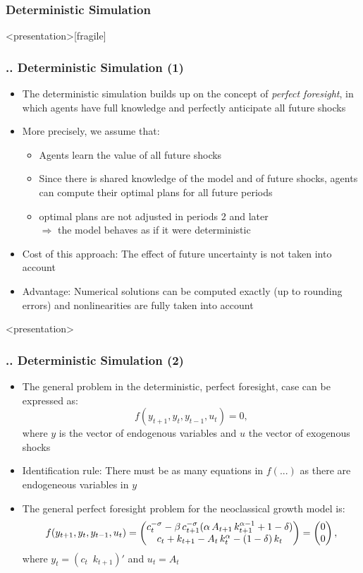 \documentclass[11pt,aspectratio=169]{beamer}
\begin{document}
\subsubsection{Deterministic Simulation}
\begin{frame}<presentation>[fragile]
	\frametitle{{\thesection.\thesubsection.\thesubsubsection} Deterministic Simulation (1)}
	\begin{itemize}
		\item The deterministic simulation builds up on the concept of \textit{perfect foresight}, in which agents have full knowledge and perfectly anticipate all future shocks
		\item More precisely, we assume that:
		\begin{itemize}
			\item Agents learn the value of all future shocks
			\item Since there is shared knowledge of the model and of future shocks, agents can compute their optimal plans for all future periods
			\item optimal plans are not adjusted in periods 2 and later\\ $\Rightarrow$ the model behaves as if it were deterministic
		\end{itemize}
		\item Cost of this approach: The effect of future uncertainty is not taken into account
		\item Advantage: Numerical solutions can be computed exactly (up to rounding errors) and nonlinearities are fully taken into account
	\end{itemize}
\end{frame}
\begin{frame}<presentation>
	\frametitle{{\thesection.\thesubsection.\thesubsubsection} Deterministic Simulation (2)}
	\begin{itemize}
		\item The general problem in the deterministic, perfect foresight, case can be expressed as: $$f(y_{t+1},y_t,y_{t-1},u_t)=0,$$ where $y$ is the vector of endogenous variables and $u$ the vector of exogenous shocks
		\item Identification rule: There must be as many equations in $f(...)$ as there are endogeneous variables in $y$
		\item The general perfect foresight problem for the neoclassical growth model is:
		\begin{gather*}
		f(y_{t+1},y_t,y_{t-1},u_t) = \begin{pmatrix} 	c_t^{-\sigma} - \beta  \thinspace c_{t+1}^{-\sigma} (\alpha \thinspace A_{t+1}  \thinspace k_{t+1}^{\alpha -1} + 1 - \delta)\\ c_t + k_{t+1} - A_t  \thinspace k_t^\alpha - (1-\delta)  \thinspace k_t \end{pmatrix} = \begin{pmatrix}
		0 \\0
		\end{pmatrix},
		\end{gather*}
		where $y_t = (c_t \enspace k_{t+1})'$ and $u_t = A_t$
	\end{itemize}
\end{frame}
\end{document}

